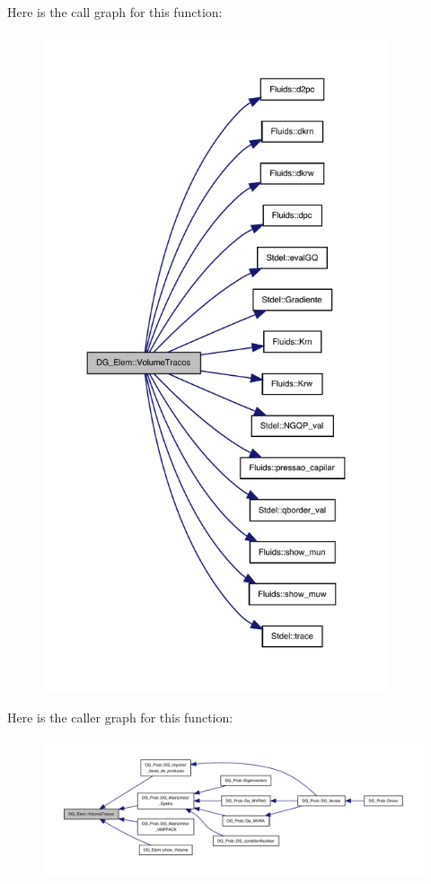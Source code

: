 Here is the call graph for this function\+:
\nopagebreak
\begin{figure}[H]
\begin{center}
\leavevmode
\includegraphics[height=550pt]{classDG__Elem_a84fab76e27b414367eb553f9d4841889_cgraph}
\end{center}
\end{figure}
Here is the caller graph for this function\+:
\nopagebreak
\begin{figure}[H]
\begin{center}
\leavevmode
\includegraphics[width=350pt]{classDG__Elem_a84fab76e27b414367eb553f9d4841889_icgraph}
\end{center}
\end{figure}
\mbox{\label{classPhElem_a55ef84501df0d4e8aec6d49846e21237}} 

